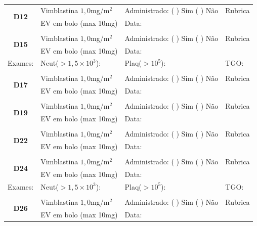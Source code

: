 \documentclass[11pt,a4paper,oldfontcommands]{memoir}
\begin{document}
\begin{center}
\begin{table}[H]
\begin{tabular}{p{1.3cm}p{5cm}|p{5cm}|p{3cm}}
    \hline
    \multicolumn{1}{c|}{\multirow{2}{*}{\textbf{D12}}}&{Vimblastina \(1,0\)mg/m\(^2\)}&{Administrado: (  ) Sim (  ) Não}&{Rubrica}\\
    \multicolumn{1}{c|}{}&{EV em bolo (max 10mg)}&{Data:}&\\
    \hline
    \\
   \hline
       \multicolumn{1}{c|}{\multirow{2}{*}{\textbf{D15}}}&{Vimblastina \(1,0\)mg/m\(^2\)}&{Administrado: (  ) Sim (  ) Não}&{Rubrica}\\
    \multicolumn{1}{c|}{}&{EV em bolo (max 10mg)}&{Data:}&\\
    \hline
    {Exames:}&{Neut(\(>1,5\times10^3\)):}&{Plaq(\(>10^5\)):}&{TGO:}
    \\
    \hline
    \\
    \hline
    \multicolumn{1}{c|}{\multirow{2}{*}{\textbf{D17}}}&{Vimblastina \(1,0\)mg/m\(^2\)}&{Administrado: (  ) Sim (  ) Não}&{Rubrica}\\
    \multicolumn{1}{c|}{}&{EV em bolo (max 10mg)}&{Data:}&\\
    \hline
   \\
    \hline
    \multicolumn{1}{c|}{\multirow{2}{*}{\textbf{D19}}}&{Vimblastina \(1,0\)mg/m\(^2\)}&{Administrado: (  ) Sim (  ) Não}&{Rubrica}\\
    \multicolumn{1}{c|}{}&{EV em bolo (max 10mg)}&{Data:}&\\
    \hline
    \\
    \hline
    \multicolumn{1}{c|}{\multirow{2}{*}{\textbf{D22}}}&{Vimblastina \(1,0\)mg/m\(^2\)}&{Administrado: (  ) Sim (  ) Não}&{Rubrica}\\
    \multicolumn{1}{c|}{}&{EV em bolo (max 10mg)}&{Data:}&\\
    \hline
    \\
    \hline
    \multicolumn{1}{c|}{\multirow{2}{*}{\textbf{D24}}}&{Vimblastina \(1,0\)mg/m\(^2\)}&{Administrado: (  ) Sim (  ) Não}&{Rubrica}\\
    \multicolumn{1}{c|}{}&{EV em bolo (max 10mg)}&{Data:}&\\
    \hline
    {Exames:}&{Neut(\(>1,5\times10^3\)):}&{Plaq(\(>10^5\)):}&{TGO:}
    \\
    \hline\\
    \hline
    \multicolumn{1}{c|}{\multirow{2}{*}{\textbf{D26}}}&{Vimblastina \(1,0\)mg/m\(^2\)}&{Administrado: (  ) Sim (  ) Não}&{Rubrica}\\
    \multicolumn{1}{c|}{}&{EV em bolo (max 10mg)}&{Data:}&\\
    \hline

\end{tabular}
\end{table}
\end{center}
\end{document}
